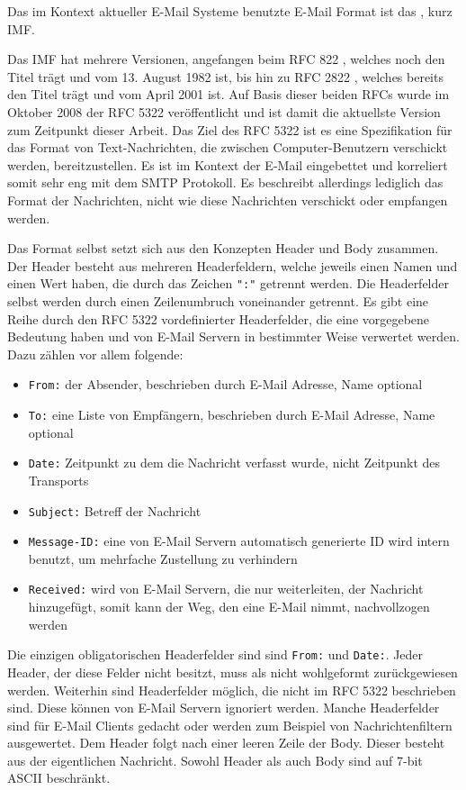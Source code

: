 Das im Kontext aktueller E-Mail Systeme benutzte E-Mail Format ist das , kurz IMF.

Das IMF hat mehrere Versionen, angefangen beim RFC 822 ,
welches noch den Titel  trägt  und vom 13. August 1982 ist, bis hin zu RFC 2822 ,
welches bereits den Titel  trägt und vom April 2001 ist. Auf Basis dieser beiden RFCs wurde im Oktober 2008 der RFC 5322  veröffentlicht und ist damit die aktuellste Version zum Zeitpunkt dieser Arbeit. Das Ziel des RFC 5322 ist es eine Spezifikation für das Format von Text-Nachrichten, die zwischen Computer-Benutzern verschickt werden, bereitzustellen. Es ist im Kontext der E-Mail eingebettet und korreliert somit sehr eng mit dem SMTP Protokoll. Es beschreibt allerdings lediglich das Format der Nachrichten, nicht wie diese Nachrichten verschickt oder empfangen werden.

Das Format selbst setzt sich aus den Konzepten Header und Body zusammen. Der Header besteht aus mehreren Headerfeldern, welche jeweils einen Namen und einen Wert haben, die durch das Zeichen \verb-":"- getrennt werden. Die Headerfelder selbst werden durch einen Zeilenumbruch voneinander getrennt. Es gibt eine Reihe durch den RFC 5322 vordefinierter Headerfelder, die eine vorgegebene Bedeutung haben und von E-Mail Servern in bestimmter Weise verwertet werden. Dazu zählen vor allem folgende:
\begin{itemize}
\item \verb-From:- der Absender, beschrieben durch E-Mail Adresse, Name optional
\item \verb-To:- eine Liste von Empfängern, beschrieben durch E-Mail Adresse, Name optional
\item \verb-Date:- Zeitpunkt zu dem die Nachricht verfasst wurde, nicht Zeitpunkt des Transports
\item \verb-Subject:- Betreff der Nachricht
\item \verb#Message-ID:# eine von E-Mail Servern automatisch generierte ID wird intern benutzt, um mehrfache Zustellung zu verhindern
\item \verb#Received:# wird von E-Mail Servern, die nur weiterleiten, der Nachricht hinzugefügt, somit kann der Weg, den eine E-Mail nimmt, nachvollzogen werden
\end{itemize}
Die einzigen obligatorischen Headerfelder sind sind \verb-From:- und \verb-Date:-. Jeder Header, der diese Felder nicht besitzt, muss als nicht wohlgeformt zurückgewiesen werden. Weiterhin sind Headerfelder möglich, die nicht im RFC 5322 beschrieben sind. Diese können von E-Mail Servern ignoriert werden. Manche Headerfelder sind für E-Mail Clients gedacht oder werden zum Beispiel von Nachrichtenfiltern ausgewertet.
Dem Header folgt nach einer leeren Zeile der Body. Dieser besteht aus der eigentlichen Nachricht. Sowohl Header als auch Body sind auf 7-bit ASCII beschränkt.

